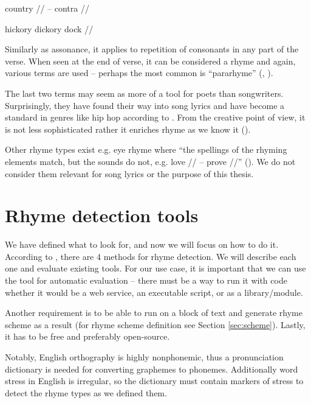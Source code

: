 country // -- contra //

hickory dickory dock //

\noindent Similarly as assonance, it applies to repetition of consonants in any part of the verse. When seen at the end of verse, it can be considered a rhyme and again, various terms are used -- perhaps the most common is ``pararhyme'' (\cite{britannica}, \cite{oxforddict2008literary}).
\newline

The last two terms may seem as more of a tool for poets than songwriters. Surprisingly, they have found their way into song lyrics and have become a standard in genres like hip hop according to \cite{vanphonological}. From the creative point of view, it is not less sophisticated rather it enriches rhyme as we know it (\cite{brogan2016poeticterms}).


Other rhyme types exist e.g. eye rhyme where ``the spellings of the rhyming elements match, but the sounds do not, e.g. love // -- prove //'' (\cite{oxforddict2008literary}). We do not consider them relevant for song lyrics or the purpose of this thesis.


\section{Rhyme detection tools}\label{rhyme_detection_tools}
We have defined what to look for, and now we will focus on how to do it. According to \cite{plechac2017presentation}, there are 4 methods for rhyme detection. We will describe each one and evaluate existing tools. For our use case, it is important that we can use the tool for automatic evaluation -- there must be a way to run it with code whether it would be a web service,  an executable script, or as a library/module.

Another requirement is to be able to run on a block of text and generate rhyme scheme as a result (for rhyme scheme definition see Section \ref{sec:scheme}). Lastly, it has to be free and preferably open-source.

Notably, English orthography is highly nonphonemic, thus a pronunciation dictionary is needed for converting graphemes to phonemes. Additionally word stress in English is irregular, so the dictionary must contain markers of stress to detect the rhyme types as we defined them.

